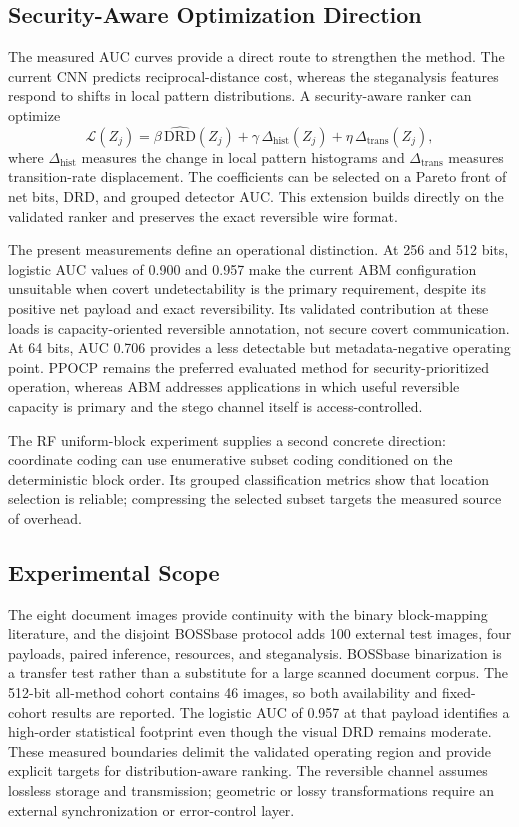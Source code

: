 \documentclass[a4paper,fleqn]{cas-dc}
\begin{document}
\subsection{Security-Aware Optimization Direction}

The measured AUC curves provide a direct route to strengthen the method. The
current CNN predicts reciprocal-distance cost, whereas the steganalysis
features respond to shifts in local pattern distributions. A security-aware
ranker can optimize
\[
\mathcal{L}(Z_j)=
\beta\,\widehat{\mathrm{DRD}}(Z_j)
+\gamma\,\Delta_{\mathrm{hist}}(Z_j)
+\eta\,\Delta_{\mathrm{trans}}(Z_j),
\]
where $\Delta_{\mathrm{hist}}$ measures the change in local pattern histograms
and $\Delta_{\mathrm{trans}}$ measures transition-rate displacement. The
coefficients can be selected on a Pareto front of net bits, DRD, and grouped
detector AUC. This extension builds directly on the validated ranker and
preserves the exact reversible wire format.

The present measurements define an operational distinction. At 256 and
512 bits, logistic AUC values of 0.900 and 0.957 make the current ABM
configuration unsuitable when covert undetectability is the primary
requirement, despite its positive net payload and exact reversibility. Its
validated contribution at these loads is capacity-oriented reversible
annotation, not secure covert communication. At 64 bits, AUC 0.706 provides a
less detectable but metadata-negative operating point. PPOCP remains the
preferred evaluated method for security-prioritized operation, whereas ABM
addresses applications in which useful reversible capacity is primary and
the stego channel itself is access-controlled.

The RF uniform-block experiment supplies a second concrete direction:
coordinate coding can use enumerative subset coding conditioned on the
deterministic block order. Its grouped classification metrics show that
location selection is reliable; compressing the selected subset targets the
measured source of overhead.

\subsection{Experimental Scope}
\label{subsec:scope}

The eight document images provide continuity with the binary block-mapping
literature, and the disjoint BOSSbase protocol adds 100 external test images,
four payloads, paired inference, resources, and steganalysis. BOSSbase
binarization is a transfer test rather than a substitute for a large scanned
document corpus. The 512-bit all-method cohort contains 46 images, so both
availability and fixed-cohort results are reported. The logistic AUC of 0.957
at that payload identifies a high-order statistical footprint even though the
visual DRD remains moderate. These measured boundaries delimit the validated
operating region and provide explicit targets for distribution-aware ranking.
The reversible channel assumes lossless storage and transmission; geometric
or lossy transformations require an external synchronization or error-control
layer.
\end{document}
